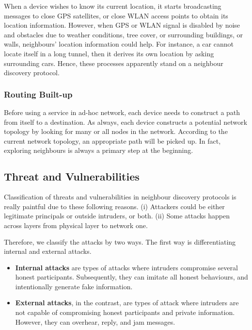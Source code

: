 When a device wishes to know its current location, it starts broadcasting messages to close GPS satellites, or close WLAN access points to obtain its location information. However, when GPS or WLAN signal is disabled by noise and obstacles due to weather conditions, tree cover, or surrounding buildings, or walls, neighbours' location information could help. For instance, a car cannot locate itself in a long tunnel, then it derives its own location by asking surrounding cars. Hence, these processes apparently stand on a neighbour discovery protocol.

\subsubsection*{Routing Built-up}

Before using a service in ad-hoc network, each device needs to construct a path from itself to a destination. As always, each device constructs a potential network topology by looking for many or all nodes in the network. According to the current network topology, an appropriate path will be picked up. In fact, exploring neighbours is always a primary step at the beginning. 

\subsection{Threat and Vulnerabilities}\label{threatndp}
Classification of threats and vulnerabilities in neighbour discovery protocols is really paintful due to these following reasons. (i) Attackers could be either legitimate principals or outside intruders, or both. (ii) Some attacks happen across layers from physical layer to network one. 

Therefore, we classify the attacks by two ways. The first way is differentiating internal and external attacks. 

\begin{itemize}
\item \textbf{Internal attacks} are types of attacks where intruders compromise several honest participants. Subsequently, they can imitate all honest behaviours, and intentionally generate fake information. 
\item \textbf{External attacks}, in the contrast, are types of attack where intruders are not capable of compromising honest participants and private information. However, they can overhear, reply, and jam messages. 
\end{itemize}

